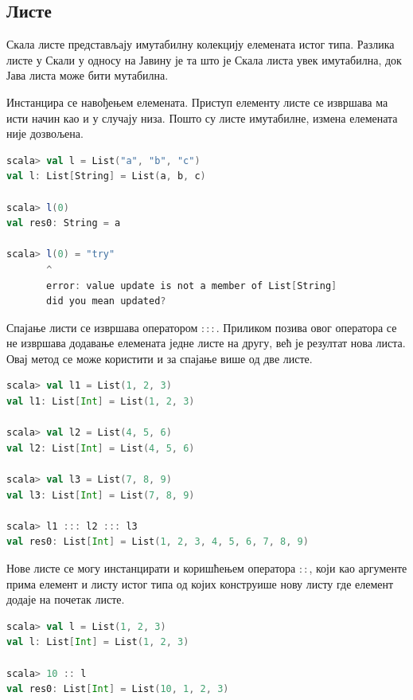 \documentclass[12pt,oneside]{memoir}
\begin{document}
\subsection{Листе}
\label{subsec:scala_lists}

Скала листе представљају имутабилну колекцију елемената истог типа. Разлика листе у Скали у односу на Јавину је та што је Скала листа увек имутабилна, док Јава листа може бити мутабилна. 

Инстанцира се навођењем елемената. Приступ елементу листе се извршава ма исти начин као и у случају низа. Пошто су листе имутабилне, измена елемената није дозвољена. \cite{scala_prog}

\begin{lstlisting}[language=Scala, caption={Пример Скала листе}, label={lst:scala_coll_lists_example}]
scala> val l = List("a", "b", "c")
val l: List[String] = List(a, b, c)

scala> l(0)
val res0: String = a

scala> l(0) = "try"
       ^
       error: value update is not a member of List[String]
       did you mean updated?
\end{lstlisting}

Спајање листи се извршава оператором $:::$. Приликом позива овог оператора се не извршава додавање елемената једне листе на другу, већ је резултат нова листа. Овај метод се може користити и за спајање више од две листе. \cite{scala_prog}

\begin{lstlisting}[language=Scala, caption={Спајање листи}, label={lst:scala_coll_lists_new_list}]
scala> val l1 = List(1, 2, 3)
val l1: List[Int] = List(1, 2, 3)

scala> val l2 = List(4, 5, 6)
val l2: List[Int] = List(4, 5, 6)

scala> val l3 = List(7, 8, 9)
val l3: List[Int] = List(7, 8, 9)

scala> l1 ::: l2 ::: l3
val res0: List[Int] = List(1, 2, 3, 4, 5, 6, 7, 8, 9)
\end{lstlisting}

Нове листе се могу инстанцирати и коришћењем оператора $::$, који као аргументе прима елемент и листу истог типа од којих конструише нову листу где елемент додаје на почетак листе.

\begin{lstlisting}[language=Scala, caption={Пример оператора ::}, label={lst:scala_coll_lists_head_op}]
scala> val l = List(1, 2, 3)
val l: List[Int] = List(1, 2, 3)

scala> 10 :: l
val res0: List[Int] = List(10, 1, 2, 3)
\end{lstlisting}
\end{document}
